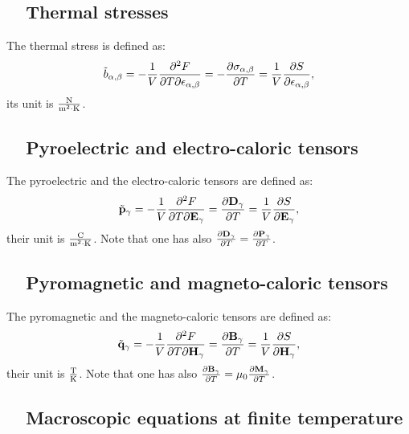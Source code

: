 \documentclass[12pt,a4paper,twoside]{report}
\begin{document}
\subsection{\ \ Thermal stresses}
The thermal stress is defined as:
\begin{equation}
\tilde b_{\alpha,\beta} = 
-{1\over V} {\partial^2 F \over \partial T
\partial \epsilon_{\alpha,\beta}}=
-{\partial \sigma_{\alpha,\beta} \over \partial T}=
{1\over V} {\partial S \over \partial {\bf \epsilon}_{\alpha,\beta}},
\end{equation}
its unit is ${{\rm N} \over {\rm m}^2 \cdot {\rm K}}$.

\subsection{\ \ Pyroelectric and electro-caloric tensors}
The pyroelectric and the electro-caloric tensors are defined as:
\begin{equation}
\tilde {\bf p}_\gamma =
-{1\over V} {\partial^2 F \over \partial T
\partial {\bf E}_\gamma}=
{\partial {\bf D}_\gamma \over \partial T}=
{1\over V} {\partial S \over \partial {\bf E}_{\gamma}},
\end{equation}
their unit is ${{\rm C} \over {\rm m}^2 \cdot {\rm K}}$. Note that one has also
${\partial {\bf D}_\gamma \over \partial T}=
{\partial {\bf P}_\gamma \over \partial T}$. 

\subsection{\ \ Pyromagnetic and magneto-caloric tensors}
The pyromagnetic and the magneto-caloric tensors are defined as:
\begin{equation}
\tilde {\bf q}_\gamma = 
-{1\over V} {\partial^2 F \over \partial T
\partial {\bf H}_\gamma}=
{\partial {\bf B}_\gamma \over \partial T}=
{1\over V} {\partial S \over \partial {\bf H}_{\gamma}},
\end{equation}
their unit is ${{\rm T} \over {\rm K}}$. Note that one has also
${\partial {\bf B}_\gamma \over \partial T}= \mu_0
{\partial {\bf M}_\gamma \over \partial T}$.

\subsection{\ \ Macroscopic equations at finite temperature}
\end{document}
